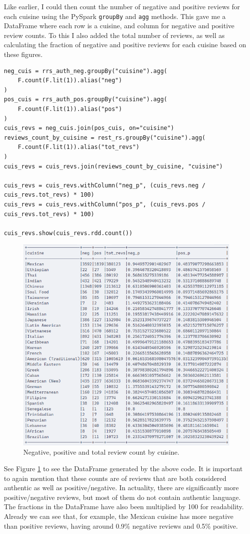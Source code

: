 Like earlier, I could then count the number of negative and positive reviews for each cuisine using the PySpark \texttt{groupBy} and \texttt{agg} methods. This gave me a DataFrame where each row is a cuisine, and column for negative and positive review counts. To this I also added the total number of reviews, as well as calculating the fraction of negative and positive reviews for each cuisine based on these figures.

\begin{verbatim}
neg_cuis = rrs_auth_neg.groupBy("cuisine").agg(
    F.count(F.lit(1)).alias("neg")
)
pos_cuis = rrs_auth_pos.groupBy("cuisine").agg(
    F.count(F.lit(1)).alias("pos")
)
cuis_revs = neg_cuis.join(pos_cuis, on="cuisine")
reviews_count_by_cuisine = rest_rs.groupBy("cuisine").agg(
    F.count(F.lit(1)).alias("tot_revs")
)
cuis_revs = cuis_revs.join(reviews_count_by_cuisine, "cuisine")

cuis_revs = cuis_revs.withColumn("neg_p", (cuis_revs.neg / cuis_revs.tot_revs) * 100)
cuis_revs = cuis_revs.withColumn("pos_p", (cuis_revs.pos / cuis_revs.tot_revs) * 100)

cuis_revs.show(cuis_revs.rdd.count())
\end{verbatim}

\begin{figure}
    \centering
    \includegraphics[width=0.5\linewidth]{images/negposcount.png}
    \caption{Negative, positive and total review count by cuisine.}
    \label{fig:negposcount}
\end{figure}

See Figure \ref{fig:negposcount} to see the DataFrame generated by the above code. It is important to again mention that these counts are of reviews that are both considered authentic as well as positive/negative. In actuality, there are significantly more positive/negative reviews, but most of them do not contain authentic language. The fractions in the DataFrame have also been multiplied by 100 for readability. Already we can see that, for example, the Mexican cuisine has more negative than positive reviews, having around 0.9\% negative reviews and 0.5\% positive.


